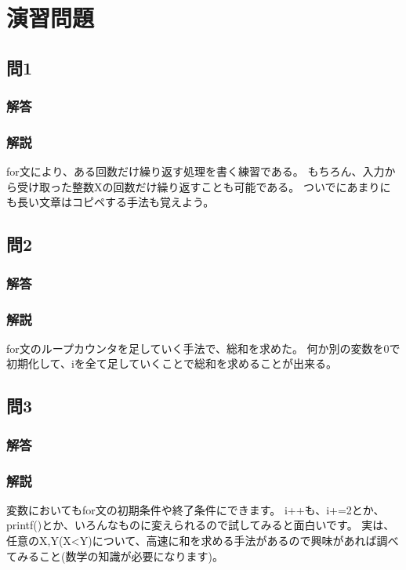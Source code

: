 \section{演習問題}
\subsection{問1}
\subsubsection{解答}

\subsubsection{解説}
for文により、ある回数だけ繰り返す処理を書く練習である。
もちろん、入力から受け取った整数Xの回数だけ繰り返すことも可能である。
ついでにあまりにも長い文章はコピペする手法も覚えよう。


\subsection{問2}
\subsubsection{解答}

\subsubsection{解説}
for文のループカウンタを足していく手法で、総和を求めた。
何か別の変数を0で初期化して、iを全て足していくことで総和を求めることが出来る。

\subsection{問3}
\subsubsection{解答}

\subsubsection{解説}
変数においてもfor文の初期条件や終了条件にできます。
i++も、i+=2とか、printf()とか、いろんなものに変えられるので試してみると面白いです。
実は、任意のX,Y(X<Y)について、高速に和を求める手法があるので興味があれば調べてみること(数学の知識が必要になります)。

